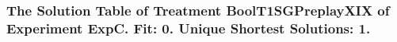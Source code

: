  \begin{frame}
 \fontsize{8pt}{9pt}\selectfont
 \frametitle{ The Solution Table of Treatment BoolT1SGPreplayXIX of Experiment ExpC. Fit: 0. Unique Shortest Solutions: 1. }

 \label{ExpCSolutionTable001.tex}  
 \end{frame}

